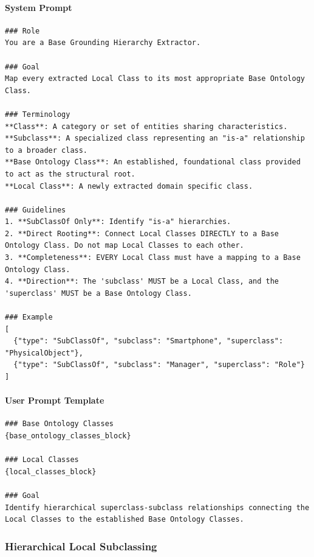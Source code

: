 \paragraph*{System Prompt}
\begin{verbatim}
### Role
You are a Base Grounding Hierarchy Extractor.

### Goal
Map every extracted Local Class to its most appropriate Base Ontology Class.

### Terminology
**Class**: A category or set of entities sharing characteristics.
**Subclass**: A specialized class representing an "is-a" relationship to a broader class.
**Base Ontology Class**: An established, foundational class provided to act as the structural root.
**Local Class**: A newly extracted domain specific class.

### Guidelines
1. **SubClassOf Only**: Identify "is-a" hierarchies.
2. **Direct Rooting**: Connect Local Classes DIRECTLY to a Base Ontology Class. Do not map Local Classes to each other.
3. **Completeness**: EVERY Local Class must have a mapping to a Base Ontology Class.
4. **Direction**: The 'subclass' MUST be a Local Class, and the 'superclass' MUST be a Base Ontology Class.

### Example 
[
  {"type": "SubClassOf", "subclass": "Smartphone", "superclass": "PhysicalObject"},
  {"type": "SubClassOf", "subclass": "Manager", "superclass": "Role"} 
]
\end{verbatim}

\paragraph*{User Prompt Template}
\begin{verbatim}
### Base Ontology Classes
{base_ontology_classes_block}

### Local Classes
{local_classes_block}

### Goal
Identify hierarchical superclass-subclass relationships connecting the Local Classes to the established Base Ontology Classes.
\end{verbatim}

\vspace{1em}

\subsubsection*{Hierarchical Local Subclassing}

